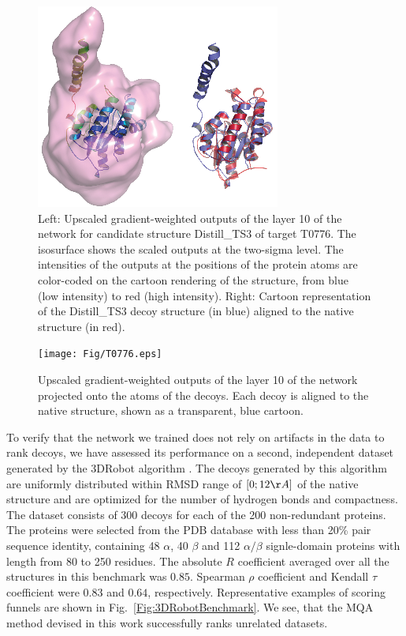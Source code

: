 \begin{figure}[H]
    \centering
    \includegraphics[width=0.5\linewidth]{Fig/FigT0776.eps}
%
    \caption{Left: Upscaled gradient-weighted outputs of the layer 10 of the network for
    candidate structure Distill\_TS3 of target T0776. The isosurface
    shows the scaled outputs at the two-sigma level. The intensities
    of the outputs at the positions of the protein atoms are
    color-coded on the cartoon rendering of the structure, from blue
    (low intensity) to red (high intensity). Right: Cartoon
    representation of the Distill\_TS3 decoy structure (in blue)
    aligned to the native structure (in red).}
%
    \label{Fig:GradCAMT0776}
\end{figure}

\begin{figure}[H]
    \centering
    \texttt{[image: Fig/T0776.eps]}
%
    \caption{Upscaled gradient-weighted outputs of the layer 10 of the network
    projected onto the atoms of the decoys. Each decoy is aligned to
    the native structure, shown as a transparent, blue cartoon.}
%
    \label{Fig:GradCAMT0776_more}
\end{figure}

To verify that the network we trained does not rely on artifacts in
the data to rank decoys, we have assessed its performance on a second,
independent dataset generated by the 3DRobot
algorithm \cite{deng20163drobot}. The decoys generated by this
algorithm are uniformly distributed within RMSD range of $[0; 12\AA]$
of the native structure and are optimized for the number of hydrogen
bonds and compactness.
%
The dataset consists of 300 decoys for each of the 200 non-redundant proteins. The proteins were 
selected from the PDB database with less than 20\% pair sequence identity, containing 48 $\alpha$, 
40 $\beta$ and 112 $\alpha/\beta$ signle-domain proteins with length from 80 to 250 residues. 
The absolute  $R$ coefficient averaged over all the
structures in this benchmark was $0.85$. Spearman $\rho$ coefficient
and Kendall $\tau$ coefficient were $0.83$ and $0.64$, respectively.
Representative examples of scoring funnels are shown in
Fig.~\ref{Fig:3DRobotBenchmark}.  We see, that the MQA method devised
in this work successfully ranks unrelated datasets.

